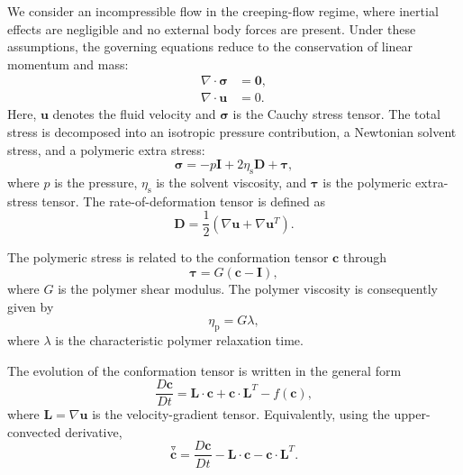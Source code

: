 \documentclass{elsarticle}
\renewcommand{\vec}[1]{\boldsymbol{#1}}
\newcommand{\ten}[1]{\boldsymbol{#1}}
\begin{document}
We consider an incompressible flow in the creeping-flow regime, where
inertial effects are negligible and no external body forces are present.
Under these assumptions, the governing equations reduce to the conservation
of linear momentum and mass:
\begin{align}
\nabla \cdot \ten{\sigma} &= \vec{0},
\label{eq:momentum_balance}
\\
\nabla \cdot \vec{u} &= 0.
\label{eq:mass_balance}
\end{align}
Here, $\vec{u}$ denotes the fluid velocity and $\ten{\sigma}$ is the
Cauchy stress tensor. The total stress is decomposed into an isotropic
pressure contribution, a Newtonian solvent stress, and a polymeric extra
stress:
\begin{equation}
\ten{\sigma}
=
-p\ten{I}
+
2\eta_{\mathrm{s}}\ten{D}
+
\ten{\tau},
\label{eq:stress_decomposition}
\end{equation}
where $p$ is the pressure, $\eta_{\mathrm{s}}$ is the solvent viscosity,
and $\ten{\tau}$ is the polymeric extra-stress tensor. The
rate-of-deformation tensor is defined as
\begin{equation}
\ten{D}
=
\frac{1}{2}
\left(
\nabla \vec{u}
+
\nabla \vec{u}^{T}
\right).
\end{equation}

The polymeric stress is related to the conformation tensor $\ten{c}$ through
\begin{equation}
\ten{\tau}
=
G\left(\ten{c}-\ten{I}\right),
\label{eq:poly_stress}
\end{equation}
where $G$ is the polymer shear modulus. The polymer viscosity is consequently
given by
\begin{equation}
\eta_{\mathrm{p}} = G\lambda,
\label{eq:polymer_viscosity}
\end{equation}
where $\lambda$ is the characteristic polymer relaxation time.

The evolution of the conformation tensor is written in the general form
\begin{equation}
\frac{D\ten{c}}{Dt}
=
\ten{L}\cdot\ten{c}
+
\ten{c}\cdot\ten{L}^{T}
-
f(\ten{c}),
\label{eq:generic_model}
\end{equation}
where $\ten{L}=\nabla\vec{u}$ is the velocity-gradient tensor. Equivalently,
using the upper-convected derivative,
\begin{equation}
\overset{\triangledown}{\ten{c}}
=
\frac{D\ten{c}}{Dt}
-
\ten{L}\cdot\ten{c}
-
\ten{c}\cdot\ten{L}^{T}.
\end{equation}
\end{document}
